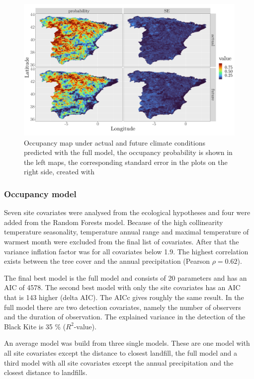 \begin{multicols}{2}
\begin{figure}[t]
	\centering
	\includegraphics[width=\linewidth]{img/best_model_map}
	\caption{Occupancy map under actual and future climate conditions predicted with the full model, the occupancy probability is shown in the left maps, the corresponding standard error in the plots on the right side, created with \textcite{ggplot2}}	
	\label{fig:map}
\end{figure}


\subsubsection*{Occupancy model}
Seven site covariates were analysed from the ecological hypotheses and four were added from the Random Forests model. Because of the high collinearity temperature seasonality, temperature annual range and maximal temperature of warmest month were excluded from the final list of covariates. After that the variance inflation factor was for all covariates below 1.9. The highest correlation exists between the tree cover and the annual precipitation (Pearson $\rho = 0.62$). 

The final best model is the full model and consists of 20 parameters and has an AIC of 4578. The second best model with only the site covariates has an AIC that is 143 higher (delta AIC). The AICc gives roughly the same result. In the full model there are two detection covariates, namely the number of observers and the duration of observation. The explained variance in the detection of the Black Kite is 35 \% ($R^2$-value). 

An average model was build from three single models. These are one model with all site covariates except the distance to closest landfill, the full model and a third model with all site covariates except the annual precipitation and the closest distance to landfills. 


\end{multicols}
